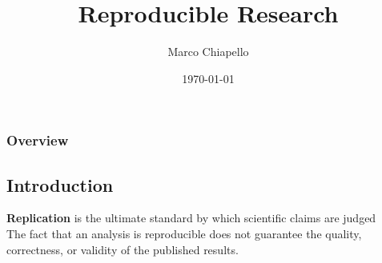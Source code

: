 \documentclass{beamer}
\title[Short title]{Reproducible Research} %
\author{Marco Chiapello} %
\institute[Center for Proteomics] %
{
Center for Proteomics\\
University of Cambridge \\ %
\medskip
\textit{mc983@cam.ac.uk} %
}
\date{\today} %
\begin{document}
\begin{frame}
\titlepage %
\end{frame}

\begin{frame}
\frametitle{Overview} %
\tableofcontents %
\end{frame}


\begin{frame}
\section{Introduction} %
\vspace{50px}
\begin{flushright}
\scriptsize {\bf Replication} is the ultimate standard by which scientific claims are judged \citep{Peng:2011et}\\
\scriptsize The fact that an analysis is reproducible does not guarantee the quality, correctness, or validity of the published results.
\end{flushright}
\end{frame}
\end{document}
